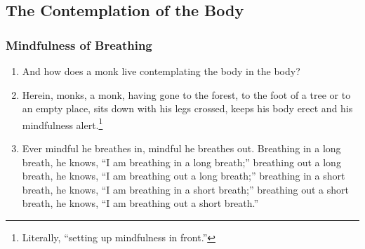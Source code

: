 \subsection*{The Contemplation of the Body}
\subsubsection*{Mindfulness of Breathing}
\begin{enumerate}[resume]
\item And how does a monk live contemplating the body in the body?
\item Herein, monks, a monk, having gone to the forest, to the foot of a tree or to an empty place, sits down with his legs crossed, keeps his body erect and his mindfulness alert.\footnote{Literally, “setting up mindfulness in front.”}
\item Ever mindful he breathes in, mindful he breathes out. Breathing in a long breath, he knows, “I am breathing in a long breath;” breathing out a long breath, he knows, “I am breathing out a long breath;” breathing in a short breath, he knows, “I am breathing in a short breath;” breathing out a short breath, he knows, “I am breathing out a short breath.”

\pagebreak


\end{enumerate}
